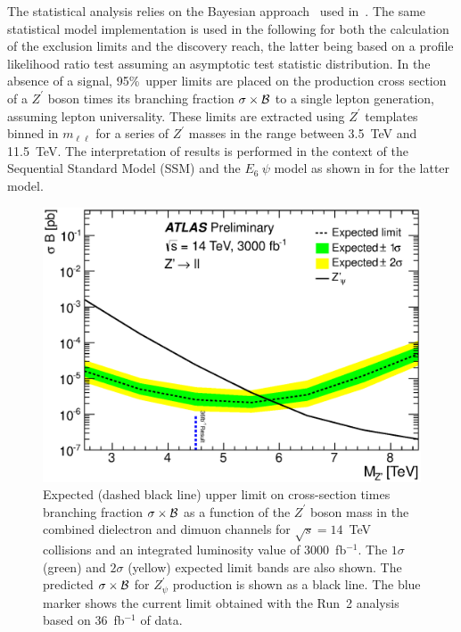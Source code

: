 The statistical analysis relies on the Bayesian approach~\cite{Caldwell:2008fw}
used in~.
The same statistical model implementation is used in the following for both the calculation of the exclusion
limits and the discovery reach, the latter being based on a profile likelihood ratio test assuming
an asymptotic test statistic distribution.
In the absence of a signal, 95\%~\cl upper limits are placed on the production cross section of
a $Z^\prime$ boson times its branching fraction $\sigma \times \cal{B}$ to a single lepton generation,
assuming lepton universality.
These limits are extracted using $Z^\prime$ templates binned in $m_{\ell\ell}$ for a series 
of $Z^\prime$ masses in the range between 3.5~TeV and 11.5~TeV.
The interpretation of results is performed in the context of the Sequential Standard Model (SSM) and the $E_6~\psi$ model
as shown in  for the latter model.
\begin{figure}[htbp]
\centering
\includegraphics[width=0.48\columnwidth]{./section7OtherSignatures/img/Limit_xsec_zprime_Psi_comb_Sys_3000ifb_14TeV.eps}
  \caption{
    Expected (dashed black line) upper limit on cross-section times branching fraction $\sigma \times \cal{B}$  as a function of the
    $Z^\prime$ boson mass in the combined dielectron and dimuon channels for $\sqrt{s} = 14$~TeV collisions
    and an integrated luminosity value of 3000~fb$^{-1}$. The $1\sigma$ (green) and $2\sigma$ (yellow)
    expected limit bands are also shown. The predicted $\sigma \times \cal{B}$ for $Z^\prime_\psi$ production
    is shown as a black line. The blue marker shows the current limit obtained with the Run~2 analysis
    based on 36~fb$^{-1}$ of data.
}
  \label{fig:ATLAS_Zpll_limits}
\end{figure}
